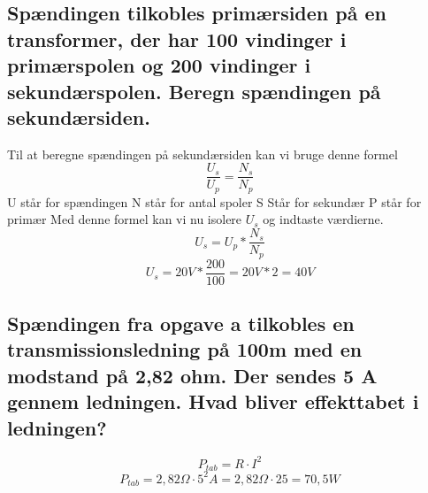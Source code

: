 \subsection{Spændingen tilkobles primærsiden på en transformer, der har 100 vindinger i primærspolen og 200 vindinger i sekundærspolen. Beregn spændingen på sekundærsiden.}
Til at beregne spændingen på sekundærsiden kan vi bruge denne formel
\begin{equation*}
    \frac{U_{s}}{U_{p}}=\frac{N_{s}}{N_{p}}
\end{equation*}
U står for spændingen\newline
N står for antal spoler\newline
S Står for sekundær\newline
P står for primær\newline
Med denne formel kan vi nu isolere \begin{math}U_{s}\end{math} og indtaste værdierne.
\begin{equation*}
    U_{s}=U_{p}*\frac{N_{s}}{N_{p}}
\end{equation*}
\begin{equation*}
    U_{s}=20V*\frac{200}{100}=20V*2=40V
\end{equation*}

\subsection{Spændingen fra opgave a tilkobles en transmissionsledning på 100m med en modstand på 2,82 ohm. Der sendes 5 A gennem ledningen. Hvad bliver effekttabet i ledningen?}
\begin{equation*}
    P_{tab}=R\cdot I^{2}
\end{equation*}
\begin{equation*}
    P_{tab}=2,82\Omega\cdot 5^{2} A=2,82\Omega\cdot 25=70,5W
\end{equation*}

\newpage